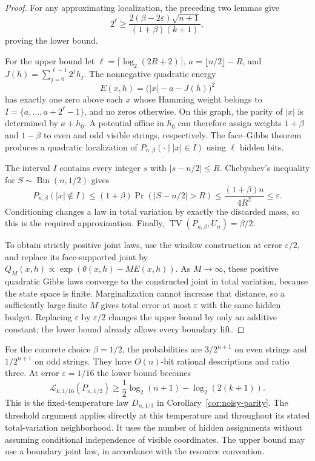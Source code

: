 \documentclass{article}
\newcommand{\LC}{\mathcal{L}}
\begin{document}
\begin{proof}
For any approximating localization, the preceding two lemmas give
\[
 2^\ell\ge
 \frac{2(\beta-2\varepsilon)\sqrt{n+1}}{(1+\beta)(k+1)},
\]
proving the lower bound.

For the upper bound let $\ell=\lceil\log_2(2R+2)\rceil$,
$a=\lfloor n/2\rfloor-R$, and
$J(h)=\sum_{j=0}^{\ell-1}2^j h_j$.
The nonnegative quadratic energy
\[
 E(x,h)=\bigl(|x|-a-J(h)\bigr)^2
\]
has exactly one zero above each $x$ whose Hamming weight belongs to
$I=\{a,\ldots,a+2^\ell-1\}$, and no zeros otherwise.
On this graph, the parity of $|x|$ is determined by $a+h_0$.
A potential affine in $h_0$ can therefore assign weights $1+\beta$ and
$1-\beta$ to even and odd visible strings, respectively.
The face--Gibbs theorem produces a quadratic localization of
$P_{n,\beta}(\mathord\cdot\mid |x|\in I)$ using $\ell$ hidden bits.

The interval $I$ contains every integer $s$ with $|s-n/2|\le R$.
Chebyshev's inequality for $S\sim\operatorname{Bin}(n,1/2)$ gives
\[
 P_{n,\beta}(|x|\notin I)
 \le (1+\beta)\Pr(|S-n/2|>R)
 \le \frac{(1+\beta)n}{4R^2}\le\varepsilon.
\]
Conditioning changes a law in total variation by exactly the discarded mass,
so this is the required approximation.  Finally,
$\operatorname{TV}(P_{n,\beta},U_n)=\beta/2$.

To obtain strictly positive joint laws, use the window construction at error
$\varepsilon/2$, and replace its face-supported joint by
$Q_M(x,h)\propto\exp(\theta(x,h)-M E(x,h))$.
As $M\to\infty$, these positive quadratic Gibbs laws converge to the
constructed joint in total variation, because the state space is finite.
Marginalization cannot increase that distance, so a sufficiently large finite
$M$ gives total error at most $\varepsilon$ with the same hidden budget.
Replacing $\varepsilon$ by $\varepsilon/2$ changes the upper bound by only an
additive constant; the lower bound already allows every boundary lift.
\end{proof}

For the concrete choice $\beta=1/2$, the probabilities are
$3/2^{n+1}$ on even strings and $1/2^{n+1}$ on odd strings.
They have $O(n)$-bit rational descriptions and ratio three.
At error $\varepsilon=1/16$ the lower bound becomes
\[
 \LC_{k,1/16}(P_{n,1/2})
 \ge \frac12\log_2(n+1)-\log_2(2(k+1)).
\]
This is the fixed-temperature law $D_{n,1/3}$ in
Corollary~\ref{cor:noisy-parity}.  The threshold argument applies directly
at this temperature and throughout its stated total-variation neighborhood.
It uses the number of hidden assignments without assuming conditional
independence of visible coordinates.  The upper bound may use a boundary
joint law, in accordance with the resource convention.
\end{document}
